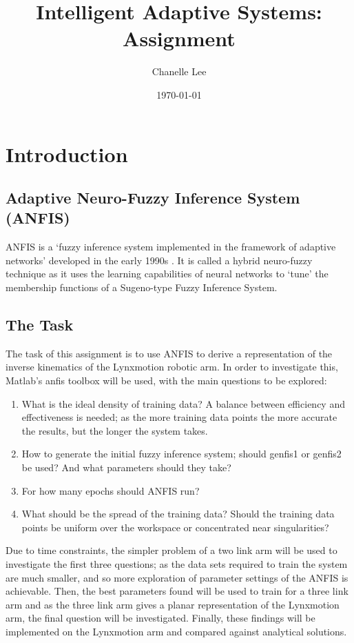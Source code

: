 \documentclass[11.5pt, twoside, a4paper]{article}
\begin{document}
\title{Intelligent Adaptive Systems: Assignment}
\author{Chanelle Lee}
\date{\today}
\maketitle

\section{Introduction}

\subsection{Adaptive Neuro-Fuzzy Inference System (ANFIS)} %
ANFIS is a `fuzzy inference system implemented in the framework of adaptive networks' developed in the early 1990s \cite{JangANFIS}. It is called a hybrid neuro-fuzzy technique as it uses the learning capabilities of neural networks to `tune' the membership functions of a Sugeno-type Fuzzy Inference System. 

\subsection{The Task}
The task of this assignment is to use ANFIS to derive a representation of the inverse kinematics of the Lynxmotion robotic arm. In order to investigate this, Matlab's anfis toolbox will be used, with the main questions to be explored:
\begin{enumerate}
\item What is the ideal density of training data? A balance between efficiency and effectiveness is needed; as the more training data points the more accurate the results, but the longer the system takes.
\item How to generate the initial fuzzy inference system; should genfis1 or genfis2 be used? And what parameters should they take?
\item For how many epochs should ANFIS run?
\item What should be the spread of the training data? Should the training data points be uniform over the workspace or concentrated near singularities?
\end{enumerate}

 Due to time constraints, the simpler problem of a two link arm will be used to investigate the first three questions; as the data sets required to train the system are much smaller, and so more exploration of parameter settings of the ANFIS is achievable. Then, the best parameters found will be used to train for a three link arm and as the three link arm gives a planar representation of the Lynxmotion arm, the final question will be investigated. Finally, these findings will be implemented on the Lynxmotion arm and compared against analytical solutions.
\end{document}
